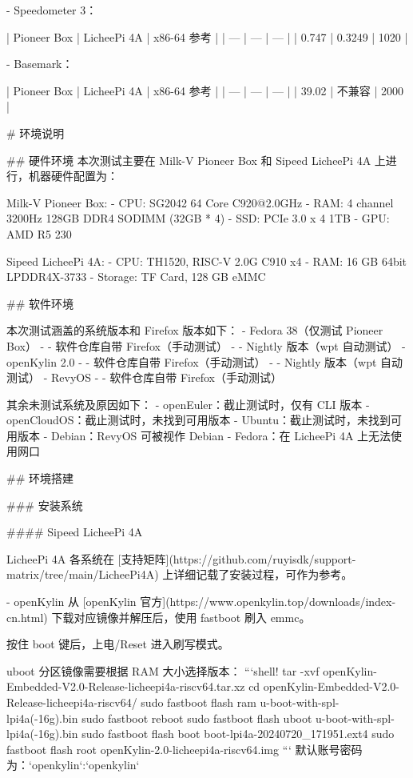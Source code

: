 \documentclass{article}
\begin{document}
\begin{markdown}
- Speedometer 3：

| Pioneer Box | LicheePi 4A | x86-64 参考 |
| --- | --- | --- |
| 0.747 | 0.3249 | 1020 |

- Basemark：

| Pioneer Box | LicheePi 4A | x86-64 参考 |
| --- | --- | --- |
| 39.02 | 不兼容 | 2000 |

# 环境说明

## 硬件环境
本次测试主要在 Milk-V Pioneer Box 和 Sipeed LicheePi 4A 上进行，机器硬件配置为：

Milk-V Pioneer Box:
- CPU: SG2042 64 Core C920@2.0GHz
- RAM: 4 channel 3200Hz 128GB DDR4 SODIMM (32GB * 4)
- SSD: PCIe 3.0 x 4 1TB
- GPU: AMD R5 230

Sipeed LicheePi 4A:
- CPU: TH1520, RISC-V 2.0G C910 x4
- RAM: 16 GB 64bit LPDDR4X-3733
- Storage: TF Card, 128 GB eMMC

## 软件环境

本次测试涵盖的系统版本和 Firefox 版本如下：
- Fedora 38（仅测试 Pioneer Box）
- - 软件仓库自带 Firefox（手动测试）
- - Nightly 版本（wpt 自动测试）
- openKylin 2.0
- - 软件仓库自带 Firefox（手动测试）
- - Nightly 版本（wpt 自动测试）
- RevyOS
- - 软件仓库自带 Firefox（手动测试）

其余未测试系统及原因如下：
- openEuler：截止测试时，仅有 CLI 版本
- openCloudOS：截止测试时，未找到可用版本
- Ubuntu：截止测试时，未找到可用版本
- Debian：RevyOS 可被视作 Debian
- Fedora：在 LicheePi 4A 上无法使用网口

## 环境搭建


### 安装系统

#### Sipeed LicheePi 4A

LicheePi 4A 各系统在 [支持矩阵](https://github.com/ruyisdk/support-matrix/tree/main/LicheePi4A) 上详细记载了安装过程，可作为参考。

- openKylin
从 [openKylin 官方](https://www.openkylin.top/downloads/index-cn.html) 下载对应镜像并解压后，使用 fastboot 刷入 emmc。

按住 boot 键后，上电/Reset 进入刷写模式。

uboot 分区镜像需要根据 RAM 大小选择版本：
```shell!
tar -xvf openKylin-Embedded-V2.0-Release-licheepi4a-riscv64.tar.xz
cd openKylin-Embedded-V2.0-Release-licheepi4a-riscv64/
sudo fastboot flash ram u-boot-with-spl-lpi4a(-16g).bin
sudo fastboot reboot
sudo fastboot flash uboot u-boot-with-spl-lpi4a(-16g).bin
sudo fastboot flash boot boot-lpi4a-20240720_171951.ext4
sudo fastboot flash root openKylin-2.0-licheepi4a-riscv64.img
```
默认账号密码为：`openkylin`:`openkylin`


\end{markdown}
\end{document}
